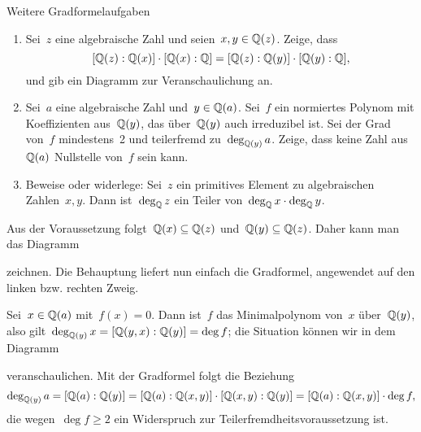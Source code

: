 \documentclass{algblatt}
\begin{document}
\begin{aufgabe}{Weitere Gradformelaufgaben}
\begin{enumerate}
\item Sei~$z$ eine algebraische Zahl und seien~$x, y \in \mathbb{Q}(z)$. Zeige, dass
\[ [\mathbb{Q}(z):\mathbb{Q}(x)] \cdot [\mathbb{Q}(x):\mathbb{Q}] = [\mathbb{Q}(z):\mathbb{Q}(y)] \cdot
[\mathbb{Q}(y):\mathbb{Q}], \]
und gib ein Diagramm zur Veranschaulichung an.
\item Sei~$a$ eine algebraische Zahl und~$y \in \mathbb{Q}(a)$. Sei~$f$ ein normiertes
Polynom mit Koeffizienten aus~$\mathbb{Q}(y)$, das über~$\mathbb{Q}(y)$
auch irreduzibel ist. Sei der Grad von~$f$ mindestens~2 und teilerfremd
zu~$\deg_{\mathbb{Q}(y)} a$. Zeige, dass keine Zahl aus~$\mathbb{Q}(a)$ Nullstelle von~$f$
sein kann.

\item Beweise oder widerlege: Sei~$z$ ein primitives Element zu algebraischen
Zahlen~$x, y$. Dann ist~$\deg_{\mathbb{Q}} z$ ein Teiler von~$\deg_{\mathbb{Q}} x \cdot \deg_{\mathbb{Q}}
y$.
\end{enumerate}

\begin{loesungE}
\item Aus der Voraussetzung folgt~$\mathbb{Q}(x) \subseteq \mathbb{Q}(z)$ und~$\mathbb{Q}(y)
\subseteq \mathbb{Q}(z)$. Daher kann man das Diagramm
\begin{center}\end{center}
zeichnen. Die Behauptung liefert nun einfach die Gradformel, angewendet auf den
linken bzw. rechten Zweig.

\item Sei~$x \in \mathbb{Q}(a)$ mit~$f(x) = 0$. Dann ist~$f$ das Minimalpolynom
von~$x$ über~$\mathbb{Q}(y)$, also gilt~$\deg_{\mathbb{Q}(y)} x = [\mathbb{Q}(y,x):\mathbb{Q}(y)] =
\deg f$; die Situation können wir in dem Diagramm
\begin{center}\end{center}
veranschaulichen. Mit der Gradformel folgt die Beziehung
\[ \deg_{\mathbb{Q}(y)} a = [\mathbb{Q}(a):\mathbb{Q}(y)] = [\mathbb{Q}(a):\mathbb{Q}(x,y)] \cdot [\mathbb{Q}(x,y):\mathbb{Q}(y)] =
  [\mathbb{Q}(a):\mathbb{Q}(x,y)] \cdot \deg f, \]
die wegen~$\deg f \geq 2$ ein Widerspruch zur Teilerfremdheitsvoraussetzung
ist.


\end{loesungE}
\end{aufgabe}
\end{document}
